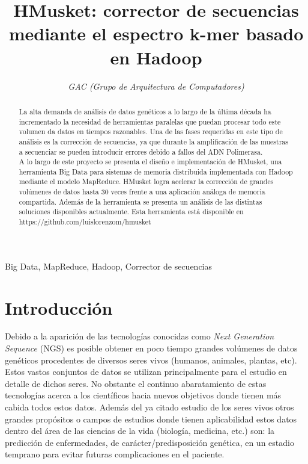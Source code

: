 \documentclass[conference]{IEEEtran}
\begin{document}
\title{HMusket: corrector de secuencias mediante el espectro k-mer basado en Hadoop}

\author{
	\textit{GAC (Grupo de Arquitectura de Computadores)}\\
}

\maketitle

\begin{abstract}
La alta demanda de análisis de datos genéticos a lo largo de la última década ha incrementado la necesidad de herramientas paralelas que puedan procesar todo este volumen da datos en tiempos razonables. Una de las fases requeridas en este tipo de análisis es la corrección de secuencias, ya que durante la amplificación de las muestras a secuenciar se pueden introducir errores debido a fallos del ADN Polimerasa.\\
A lo largo de este proyecto se presenta el diseño e implementación de HMusket, una herramienta Big Data para sistemas de memoria distribuida implementada con Hadoop mediante el modelo MapReduce. HMusket logra acelerar la corrección de grandes volúmenes de datos hasta 30 veces frente a una aplicación análoga de memoria compartida. Además de la herramienta se presenta un análisis de las distintas soluciones disponibles actualmente. Esta herramienta está disponible en https://github.com/luislorenzom/hmusket
\end{abstract}

\begin{IEEEkeywords}
Big Data, MapReduce, Hadoop, Corrector de secuencias
\end{IEEEkeywords}

\section{Introducción}
Debido a la aparición de las tecnologías conocidas como \textit{Next Generation Sequence} (NGS)\cite{ngs} es posible obtener en poco tiempo grandes volúmenes de datos genéticos procedentes de diversos seres vivos (humanos, animales, plantas, etc). Estos vastos conjuntos de datos se utilizan principalmente para el estudio en detalle de dichos seres. 
No obstante el continuo abaratamiento de estas tecnologías acerca a los científicos hacia nuevos objetivos donde tienen más cabida todos estos datos. Además del ya citado estudio de los seres vivos otros grandes propósitos o campos de estudios donde tienen aplicabilidad estos datos dentro del área de las ciencias de la vida (biología, medicina, etc.) son: la predicción de enfermedades, de carácter/predisposición genética, en un estadio temprano para evitar futuras complicaciones en el paciente. \\
\end{document}
